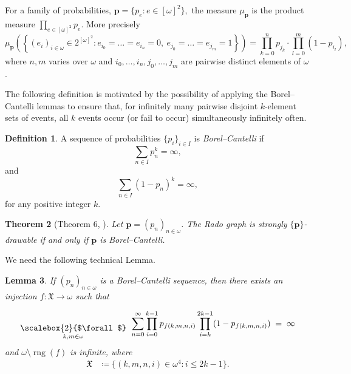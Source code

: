 \documentclass{amsart}
\newtheorem{theorem}{Theorem}[section]
\newtheorem{lemma}[theorem]{Lemma}
\theoremstyle{plain}
\theoremstyle{definition}
\newtheorem{df}[theorem]{Definition}
\theoremstyle{remark}
\numberwithin{equation}{section}
\DeclareMathOperator{\rng}{rng}
\begin{document}
For a family of probabilities, $\mathbf{p}=\{p_e : e\in [\omega]^{2}\},$ the measure $\mu_\textbf{p}$ is the product measure $\prod\limits_{e\in[\omega]^2}p_e.$ More precisely
\[
\mu_{\textbf{p}} \left(\left\{(e_i)_{i\in\omega}\in 2^{[\omega]^2} \colon e_{i_0} = \ldots =e_{i_n}=0, \   e_{j_0} = \ldots=e_{j_m}=1  \right\}\right)=\prod_{k=0}^n p_{j_k} \cdot \prod_{l=0}^m (1-p_{i_l}),
\]
where $n,m$ varies over $\omega$ and $i_0, \ldots,i_n,j_0,\ldots,j_m$ are pairwise distinct elements of $\omega$.

The following definition is motivated by the possibility of applying the Borel–Cantelli lemmas to ensure that, for infinitely many pairwise disjoint $k$-element sets of events, all $k$ events occur (or fail to occur) simultaneously infinitely often.
\begin{df}
    A sequence of probabilities $\{p_i\}_{i\in I}$ is \emph{Borel--Cantelli} if
    $$\sum\limits_{n\in I} p_n^k=\infty,$$ 
    and
    $$\sum\limits_{n\in I} (1-p_n)^k=\infty,$$
    for any positive integer $k$.
\end{df}



\begin{theorem}[Theorem 6, \cite{coregliano2024random}]
    Let $\mathbf{p}=(p_n)_{n\in \omega}$. The Rado graph is strongly  $ \{ \mathbf{p} \}$-drawable if and only if $\mathbf{p}$ is Borel--Cantelli.
\end{theorem}

We need the following technical Lemma.
\begin{lemma}\cite[Lemma 2.3]{coregliano2024random}\label{LemM}
  If $(p_n)_{n\in \omega}$ is a Borel--Cantelli sequence, 
  then there exists an injection $f\colon \mathfrak{X} \to \omega$ such that 


\begin{align*}
  \mathrel{%
    \raisebox{-1.2ex}{%
      $\displaystyle 
       \mathop{\scalebox{2}{$\forall$}}_{\substack{\scriptstyle k,m\in\omega}}$
    }%
  }
  \sum_{n=0}^\infty
    \prod_{i=0}^{k-1}p_{f(k,m,n,i)}
    \prod_{i=k}^{2k-1}(1-p_{f(k,m,n,i)})
  \;=\;\infty
\end{align*}
  and $\omega \setminus \rng(f)$ is infinite, where
  \begin{align*}
    \mathfrak{X} & \coloneqq \{(k,m,n,i)\in\omega^4 : i\leqslant 2k-1\}.
  \end{align*}
\end{lemma}
\end{document}

